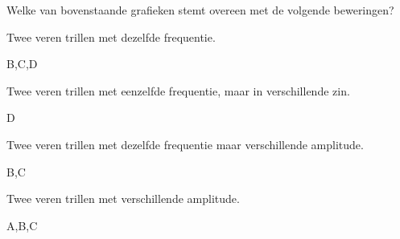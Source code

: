 \documentclass{ximera}
\begin{document}
\begin{exercise}
Welke van bovenstaande grafieken stemt overeen met de volgende beweringen?
    \begin{question}
        Twee veren trillen met dezelfde frequentie.
            \begin{oplossing}
                B,C,D
            \end{oplossing}
    \end{question}

    \begin{question}
        Twee veren trillen met eenzelfde frequentie, maar in verschillende zin.
            \begin{oplossing}
                D
            \end{oplossing}
    \end{question}

    \begin{question}
    Twee veren trillen met dezelfde frequentie maar verschillende amplitude.
        \begin{oplossing}
            B,C
        \end{oplossing}
    \end{question}

    \begin{question}
        Twee veren trillen met verschillende amplitude.  
            \begin{oplossing}
                A,B,C
            \end{oplossing}
    
\end{question}

\end{exercise}
\end{document}
